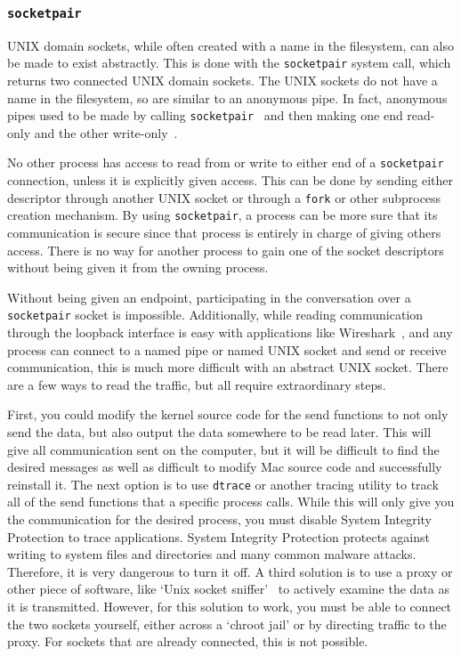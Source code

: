 \subsubsection{\texttt{socketpair}}
\label{sec:socketpair}
UNIX domain sockets, while often created with a name in the filesystem, can also be made to exist abstractly.  This is done with the \texttt{socketpair} system call, which returns two connected UNIX domain sockets.  The UNIX sockets do not have a name in the filesystem, so are similar to an anonymous pipe.  In fact, anonymous pipes used to be made by calling \texttt{socketpair}~\cite{apple_2005} and then making one end read-only and the other write-only~\cite[p 253]{Stevens:1996:TIT:233130}.

No other process has access to read from or write to either end of a \texttt{socketpair} connection, unless it is explicitly given access.  This can be done by sending either descriptor through another UNIX socket or through a \texttt{fork} or other subprocess creation mechanism.  By using \texttt{socketpair}, a process can be more sure that its communication is secure since that process is entirely in charge of giving others access.  There is no way for another process to gain one of the socket descriptors without being given it from the owning process.

Without being given an endpoint, participating in the conversation over a \texttt{socketpair} socket is impossible.  Additionally, while reading communication through the loopback interface is easy with applications like Wireshark~\cite{wireshark}, and any process can connect to a named pipe or named UNIX socket and send or receive communication, this is much more difficult with an abstract UNIX socket.  There are a few ways to read the traffic, but all require extraordinary steps.

First, you could modify the kernel source code for the send functions to not only send the data, but also output the data somewhere to be read later.  This will give all communication sent on the computer, but it will be difficult to find the desired messages as well as difficult to modify Mac source code and successfully reinstall it.  The next option is to use \texttt{dtrace} or another tracing utility to track all of the send functions that a specific process calls.  While this will only give you the communication for the desired process, you must disable System Integrity Protection to trace applications.  System Integrity Protection protects against writing to system files and directories and many common malware attacks.  Therefore, it is very dangerous to turn it off.  A third solution is to use a proxy or other piece of software, like `Unix socket sniffer'~\cite{socketSniffer} to actively examine the data as it is transmitted.  However, for this solution to work, you must be able to connect the two sockets yourself, either across a `chroot jail' or by directing traffic to the proxy.  For sockets that are already connected, this is not possible.

